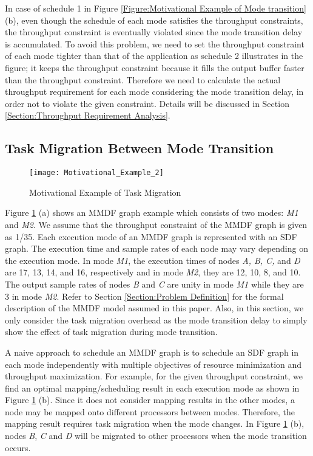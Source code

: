 \documentclass[prodmode,acmtecs]{acmsmall}
\begin{document}
In case of schedule 1 in Figure \ref{Figure:Motivational Example of Mode transition} (b), even though the schedule of each mode satisfies the throughput constraints, the throughput constraint is eventually violated since the mode transition delay is accumulated. To avoid this problem, we need to set the throughput constraint of each mode tighter than that of the application as schedule 2 illustrates in the figure; it keeps the throughput constraint because it fills the output buffer faster than the throughput constraint. Therefore we need to calculate the actual throughput requirement for each mode considering the mode transition delay, in order not to violate the given constraint. Details will be discussed in Section \ref{Section:Throughput Requirement Analysis}.

\subsection{Task Migration Between Mode Transition}
\label{SubSection:Task migration}

\begin{figure} [ht]
\centerline{\texttt{[image: Motivational\_Example\_2]}}
\caption{Motivational Example of Task Migration}
\label{Figure:Motivational Example of Task Migration}
\end{figure}

Figure \ref{Figure:Motivational Example of Task Migration} (a) shows an MMDF graph example which consists of two modes: \textit{M1} and \textit{M2}. We assume that the throughput constraint of the MMDF graph is given as 1/35. Each execution mode of an MMDF graph is represented with an SDF graph. The execution time and sample rates of each node may vary depending on the execution mode. In mode \textit{M1}, the execution times of nodes \textit{A, B, C,} and \textit{D} are 17, 13, 14, and 16, respectively and in mode \textit{M2}, they are 12, 10, 8, and 10. The output sample rates of nodes \textit{B} and \textit{C} are unity in mode \textit{M1} while they are 3 in mode \textit{M2}. Refer to Section \ref{Section:Problem Definition} for the formal description of the MMDF model assumed in this paper. Also, in this section, we only consider the task migration overhead as the mode transition delay to simply show the effect of task migration during mode transition.

 A naive approach to schedule an MMDF graph is to schedule an SDF graph in each mode independently with multiple objectives of resource minimization and throughput maximization. For example, for the given throughput constraint, we find an optimal mapping/scheduling result in each execution mode as shown in Figure \ref{Figure:Motivational Example of Task Migration} (b). Since it does not consider mapping results in the other modes, a node may be mapped onto different processors between modes. Therefore, the mapping result requires task migration when the mode changes. In Figure \ref{Figure:Motivational Example of Task Migration} (b), nodes \textit{B}, \textit{C} and \textit{D} will be migrated to other processors when the mode transition occurs.
\end{document}
